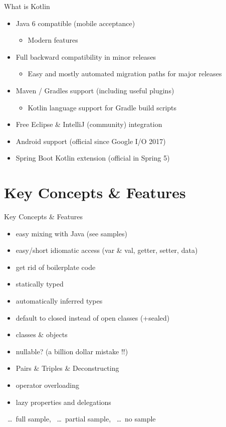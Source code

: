 \begin{frame}{What is Kotlin}
	\begin{itemize}
		\item Java 6 compatible (mobile acceptance)
		\begin{itemize}
			\item Modern features 
		\end{itemize}
		\item Full backward compatibility in minor releases
		\begin{itemize}
			\item Easy and mostly automated migration paths for major releases 
		\end{itemize}
		\item Maven / Gradles support (including useful plugins)
		\begin{itemize}
			\item Kotlin language support for Gradle build scripts
		\end{itemize}
		\item Free Eclipse \& IntelliJ (community) integration
		\item Android support (official since Google I/O 2017)
		\item Spring Boot Kotlin extension (official in Spring 5)
	\end{itemize}
\end{frame}

\section{Key Concepts \& Features}

\begin{frame}{Key Concepts \& Features}
	\begin{itemize}
		\item easy mixing with Java (see samples) \cmark
		\item easy/short idiomatic access (var \& val, getter, setter, data) \cmark
		\item get rid of boilerplate code \cmark
		\item statically typed \cmark
		\item automatically inferred types \cmark
		\item default to closed instead of open classes (+sealed) \tmark
		\item classes \& objects \tmark
		\item nullable? (a billion dollar mistake !!) \cmark
		\item Pairs \& Triples \& Deconstructing \cmark
		\item operator overloading \cmark
		\item lazy properties and delegations \cmark
	\end{itemize}
\cmark\ \dots\ full sample, \tmark\ \dots\ partial sample, \xmark\ \dots\ no sample
\end{frame}


